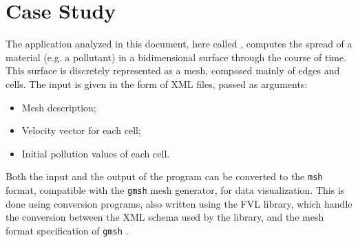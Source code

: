 \section{Case Study}
\label{sec:case}


The application analyzed in this document, here called \polu, computes the spread of a material (e.g. a pollutant) in a bidimensional surface through the course of time. This surface is discretely represented as a mesh, composed mainly of edges and cells. The input is given in the form of XML files, passed as arguments:
\begin{itemize}
	\item Mesh description;
	\item Velocity vector for each cell;
	\item Initial pollution values of each cell.
\end{itemize}

Both the input and the output of the program can be converted to the \texttt{msh} format, compatible with the \texttt{gmsh} mesh generator, for data visualization. This is done using conversion programs, also written using the FVL library, which handle the conversion between the XML schema used by the library, and the mesh format specification of \texttt{gmsh} \cite{gmsh}.



